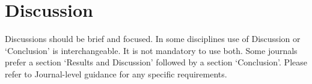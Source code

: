 \documentclass[lineno,pdflatex,sn-basic]{sn-jnl}%
\theoremstyle{thmstyleone}%
\theoremstyle{thmstyletwo}%
\theoremstyle{thmstylethree}%
\begin{document}
\section{Discussion}\label{sec12}

Discussions should be brief and focused. In some disciplines use of Discussion or `Conclusion' is interchangeable. It is not mandatory to use both. Some journals prefer a section `Results and Discussion' followed by a section `Conclusion'. Please refer to Journal-level guidance for any specific requirements. 




\end{document}
